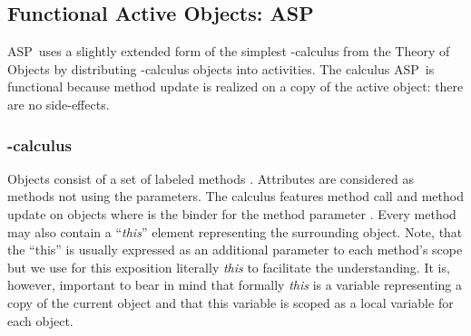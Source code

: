 \documentclass[10pt, conference, compsocconf]{IEEEtran}
\newcommand\aspfun{ASP\ }
\begin{document}
\subsection{Functional Active Objects: \aspfun}
\label{sec:aspfun}
\aspfun uses a slightly extended form of the simplest -calculus 
from the Theory of Objects \cite{AC96a} by distributing 
-calculus objects into activities. 
The calculus \aspfun is functional because method update is realized on a copy of the active
object: there are no side-effects.


\subsubsection{-calculus}
Objects consist of a set of labeled methods . Attributes 
are considered as methods not using the parameters. 
The calculus features method call  and method update  on objects where
 is the binder for the method parameter . Every method may also contain a ``{\it this}'' element 
representing the surrounding object. Note, that the ``this'' is usually \cite{AC96a} expressed as an additional
parameter  to each method's  scope but we use for this exposition literally 
{\it this} to facilitate the understanding. It is, however, important to bear in mind that 
formally {\it this} is a variable representing a copy of the current object and that this 
variable is scoped as a local variable for each object.
\end{document}
